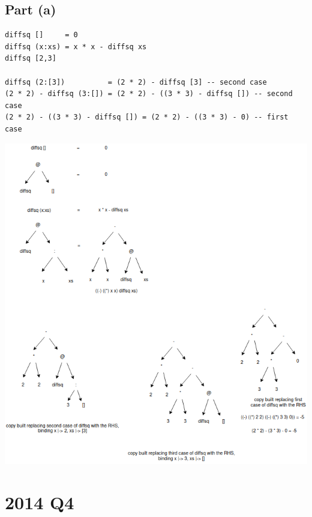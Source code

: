 \documentclass[11pt]{article}
\begin{document}
\subsection{Part (a)}
\label{sec:org7540336}
\begin{verbatim}
diffsq []     = 0
diffsq (x:xs) = x * x - diffsq xs
diffsq [2,3]

diffsq (2:[3])          = (2 * 2) - diffsq [3] -- second case
(2 * 2) - diffsq (3:[]) = (2 * 2) - ((3 * 3) - diffsq []) -- second case
(2 * 2) - ((3 * 3) - diffsq []) = (2 * 2) - ((3 * 3) - 0) -- first case
\end{verbatim}
\begin{center}
\includegraphics[width=160mm]{./diffsq-xs.png}
\end{center}
\section{2014 Q4}
\label{sec:orgc6524b5}
\end{document}
